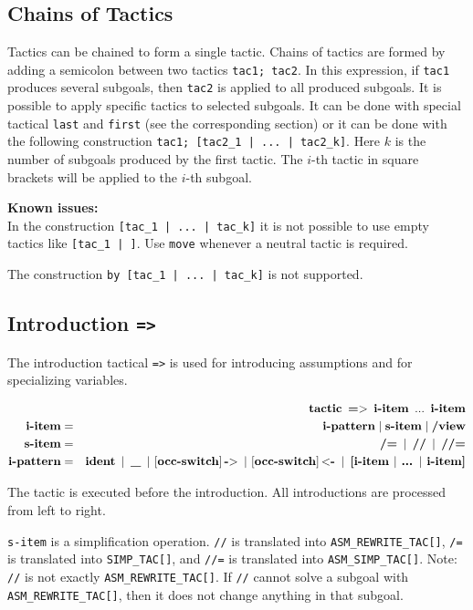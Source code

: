 \documentclass[a4paper]{article}
\newcommand{\issues}{{\bf Known issues:}\\}
\newcommand{\xx}[1]{\mathop{\text{\bf #1}}}
\begin{document}
\subsection{Chains of Tactics}
Tactics can be chained to form a single tactic. Chains of tactics are formed by adding a semicolon between two tactics \verb|tac1; tac2|. In this expression, if \verb|tac1| produces several subgoals, then \verb|tac2| is applied to all produced subgoals. It is possible to apply specific tactics to selected subgoals. It can be done with special tactical \verb|last| and \verb|first| (see the corresponding section) or it can be done with the following construction \verb$tac1; [tac2_1 | ... | tac2_k]$. Here $k$ is the number of subgoals produced by the first tactic. The $i$-th tactic in square brackets will be applied to the $i$-th subgoal.

\issues
In the construction \verb$[tac_1 | ... | tac_k]$ it is not possible to use empty tactics like \verb$[tac_1 | ]$. Use \verb|move| whenever a neutral tactic is required.

The construction \verb$by [tac_1 | ... | tac_k]$ is not supported.



\subsection{Introduction {\tt =>}}
The introduction tactical \verb|=>| is  used for introducing assumptions and for specializing variables.

\begin{eqnarray*}
&&\xx{tactic}\ \xx{=$>$}\ \xx{i-item}\ ...\ \xx{i-item}\\
\xx{i-item} &=& \xx{i-pattern} \mathrel{|} \xx{s-item} \mathrel{|} \xx{/view}\\
\xx{s-item} &=& \xx{/=}\ |\ \xx{//}\ |\ \xx{//=}\\
\xx{i-pattern} &=& \xx{ident}\ |\ \xx{\_}\ |\ 
				[\xx{occ-switch}]\xx{-$>$}\ |\ [\xx{occ-switch}]\xx{$<$-}\ |\ 
				\xx{[i-item $|$ ... $|$ i-item]}
\end{eqnarray*}

The tactic is executed before the introduction. All introductions are processed from left to right.

\verb|s-item| is a simplification operation. \verb|//| is translated into \verb|ASM_REWRITE_TAC[]|, \verb|/=| is translated into \verb|SIMP_TAC[]|, and \verb|//=| is translated into \verb|ASM_SIMP_TAC[]|. Note: \verb|//| is not exactly \verb|ASM_REWRITE_TAC[]|. If \verb|//| cannot solve a subgoal with \verb|ASM_REWRITE_TAC[]|, then it does not change anything in that subgoal.
\end{document}
